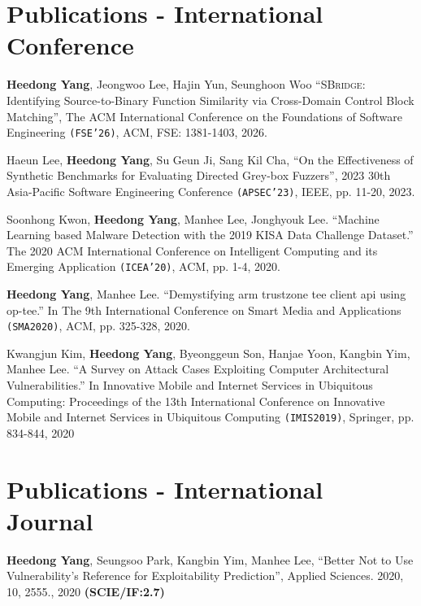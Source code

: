 \documentclass[letterpaper,11pt]{article}
\begin{document}

  \resumeSubHeadingListEnd


\section{Publications - International Conference}
\vspace{3pt}
\paperConfListStart
  \resumeItem
    {\textbf{Heedong Yang}, Jeongwoo Lee, Hajin Yun, Seunghoon Woo ``{\textsc{SBridge}}: Identifying Source-to-Binary Function Similarity via Cross-Domain Control Block Matching'', The ACM International Conference on the Foundations of Software Engineering \texttt{(FSE'26)}, ACM, FSE: 1381-1403, 2026. \topconf}
    
  \resumeItem
    {Haeun Lee, \textbf{Heedong Yang}, Su Geun Ji, Sang Kil Cha, ``On the Effectiveness of Synthetic Benchmarks for Evaluating Directed Grey-box Fuzzers'', 2023 30th Asia-Pacific Software Engineering Conference \texttt{(APSEC'23)}, IEEE, pp. 11-20, 2023.}

  \resumeItem
    {Soonhong Kwon, \textbf{Heedong Yang}, Manhee Lee, Jonghyouk Lee. ``Machine Learning based Malware Detection with the 2019 KISA Data Challenge Dataset.'' The 2020 ACM International Conference on Intelligent Computing and its Emerging Application \texttt{(ICEA'20)}, ACM, pp. 1-4, 2020.}

  \resumeItem
    {\textbf{Heedong Yang}, Manhee Lee. ``Demystifying arm trustzone tee client api using op-tee.'' In The 9th International Conference on Smart Media and Applications \texttt{(SMA2020)}, ACM, pp. 325-328, 2020.}

  \resumeItem
    {Kwangjun Kim, \textbf{Heedong Yang}, Byeonggeun Son, Hanjae Yoon, Kangbin Yim, Manhee Lee. ``A Survey on Attack Cases Exploiting Computer Architectural Vulnerabilities.'' In Innovative Mobile and Internet Services in Ubiquitous Computing: Proceedings of the 13th International Conference on Innovative Mobile and Internet Services in Ubiquitous Computing \texttt{(IMIS2019)}, Springer, pp. 834-844, 2020}
\paperConfListEnd


\section{Publications - International Journal}
  \vspace{3pt}
  \paperJourListStart
    \resumeItem
      {\textbf{Heedong Yang}, Seungsoo Park, Kangbin Yim, Manhee Lee, ``Better Not to Use Vulnerability's Reference for Exploitability Prediction'', Applied Sciences. 2020, 10, 2555., 2020 \textbf{(SCIE/IF:2.7)}}
  \paperJourListEnd
\end{document}
